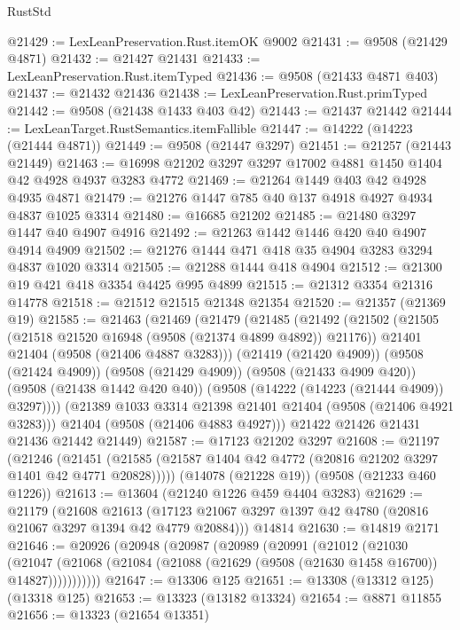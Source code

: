 \begin{lexlean}{RustStd}
\begin{coremodule}
@21429 := LexLeanPreservation.Rust.itemOK @9002
@21431 := @9508 (@21429 @4871)
@21432 := @21427 @21431
@21433 := LexLeanPreservation.Rust.itemTyped
@21436 := @9508 (@21433 @4871 @403)
@21437 := @21432 @21436
@21438 := LexLeanPreservation.Rust.primTyped
@21442 := @9508 (@21438 @1433 @403 @42)
@21443 := @21437 @21442
@21444 := LexLeanTarget.RustSemantics.itemFallible
@21447 := @14222 (@14223 (@21444 @4871))
@21449 := @9508 (@21447 @3297)
@21451 := @21257 (@21443 @21449)
@21463 := @16998 @21202 @3297 @3297 @17002 @4881 @1450 @1404 @42 @4928 @4937 @3283 @4772
@21469 := @21264 @1449 @403 @42 @4928 @4935 @4871
@21479 := @21276 @1447 @785 @40 @137 @4918 @4927 @4934 @4837 @1025 @3314
@21480 := @16685 @21202
@21485 := @21480 @3297 @1447 @40 @4907 @4916
@21492 := @21263 @1442 @1446 @420 @40 @4907 @4914 @4909
@21502 := @21276 @1444 @471 @418 @35 @4904 @3283 @3294 @4837 @1020 @3314
@21505 := @21288 @1444 @418 @4904
@21512 := @21300 @19 @421 @418 @3354 @4425 @995 @4899
@21515 := @21312 @3354 @21316 @14778
@21518 := @21512 @21515 @21348 @21354
@21520 := @21357 (@21369 @19)
@21585 := @21463
    (@21469
      (@21479
        (@21485
          (@21492
            (@21502
              (@21505 (@21518 @21520 @16948 (@9508 (@21374 @4899 @4892)) @21176))
              @21401
              @21404
              (@9508 (@21406 @4887 @3283)))
            (@21419 (@21420 @4909))
            (@9508 (@21424 @4909))
            (@9508 (@21429 @4909))
            (@9508 (@21433 @4909 @420))
            (@9508 (@21438 @1442 @420 @40))
            (@9508 (@14222 (@14223 (@21444 @4909)) @3297))))
        (@21389 @1033 @3314 @21398 @21401 @21404 (@9508 (@21406 @4921 @3283)))
        @21404
        (@9508 (@21406 @4883 @4927)))
      @21422
      @21426
      @21431
      @21436
      @21442
      @21449)
@21587 := @17123 @21202 @3297
@21608 := @21197
    (@21246 (@21451 (@21585 (@21587 @1404 @42 @4772 (@20816 @21202 @3297 @1401 @42 @4771 @20828)))))
    (@14078 (@21228 @19))
    (@9508 (@21233 @460 @1226))
@21613 := @13604 (@21240 @1226 @459 @4404 @3283)
@21629 := @21179
    (@21608
      @21613
      (@17123 @21067 @3297 @1397 @42 @4780 (@20816 @21067 @3297 @1394 @42 @4779 @20884)))
    @14814
@21630 := @14819 @2171
@21646 := @20926
    (@20948
      (@20987
        (@20989
          (@20991
            (@21012
              (@21030
                (@21047
                  (@21068 (@21084 (@21088 (@21629 (@9508 (@21630 @1458 @16700)) @14827)))))))))))
@21647 := @13306 @125
@21651 := @13308 (@13312 @125) (@13318 @125)
@21653 := @13323 (@13182 @13324)
@21654 := @8871 @11855
@21656 := @13323 (@21654 @13351)

\end{coremodule}
\end{lexlean}
